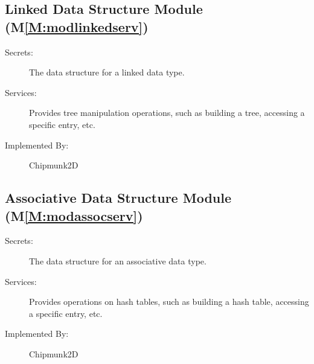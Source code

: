 \documentclass[12pt]{article}
\begin{document}
\subsection{Linked Data Structure Module (M\ref{M:modlinkedserv})}
\label{Sec:LinkDataStruModu()}
\begin{description}
\item[Secrets:]The data structure for a linked data type.
\item[Services:]Provides tree manipulation operations, such as building a tree, accessing a specific entry, etc.
\item[Implemented By:]Chipmunk2D
\end{description}
\subsection{Associative Data Structure Module (M\ref{M:modassocserv})}
\label{Sec:AssoDataStruModu()}
\begin{description}
\item[Secrets:]The data structure for an associative data type.
\item[Services:]Provides operations on hash tables, such as building a hash table, accessing a specific entry, etc.
\item[Implemented By:]Chipmunk2D
\end{description}
\end{document}
